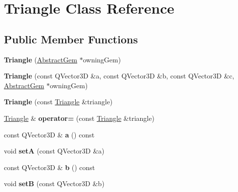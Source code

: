 \hypertarget{class_triangle}{}\section{Triangle Class Reference}
\label{class_triangle}
\subsection*{Public Member Functions}
\begin{DoxyCompactItemize}
\item 
\hypertarget{class_triangle_ab9220b045480de037944ed99913ecea8}{}{\bfseries Triangle} (\hyperlink{class_abstract_gem}{Abstract\+Gem} $\ast$owning\+Gem)\label{class_triangle_ab9220b045480de037944ed99913ecea8}

\item 
\hypertarget{class_triangle_a860d12ec88ef8821dd10a5a653a7413d}{}{\bfseries Triangle} (const Q\+Vector3\+D \&a, const Q\+Vector3\+D \&b, const Q\+Vector3\+D \&c, \hyperlink{class_abstract_gem}{Abstract\+Gem} $\ast$owning\+Gem)\label{class_triangle_a860d12ec88ef8821dd10a5a653a7413d}

\item 
\hypertarget{class_triangle_a889893fe34e2eb7121082b86199d5628}{}{\bfseries Triangle} (const \hyperlink{class_triangle}{Triangle} \&triangle)\label{class_triangle_a889893fe34e2eb7121082b86199d5628}

\item 
\hypertarget{class_triangle_aae57b61e09898f54256a83e76acfe502}{}\hyperlink{class_triangle}{Triangle} \& {\bfseries operator=} (const \hyperlink{class_triangle}{Triangle} \&triangle)\label{class_triangle_aae57b61e09898f54256a83e76acfe502}

\item 
\hypertarget{class_triangle_a430bf0a9d8eaf20ea7bdefcd8082588c}{}const Q\+Vector3\+D \& {\bfseries a} () const \label{class_triangle_a430bf0a9d8eaf20ea7bdefcd8082588c}

\item 
\hypertarget{class_triangle_a24c012d83d7e6c5d0b27985d8dcb64da}{}void {\bfseries set\+A} (const Q\+Vector3\+D \&a)\label{class_triangle_a24c012d83d7e6c5d0b27985d8dcb64da}

\item 
\hypertarget{class_triangle_a8327124c9b9b752be94187c9fbf3f460}{}const Q\+Vector3\+D \& {\bfseries b} () const \label{class_triangle_a8327124c9b9b752be94187c9fbf3f460}

\item 
\hypertarget{class_triangle_a9f889b49a5ea3b4be4c4366c63673095}{}void {\bfseries set\+B} (const Q\+Vector3\+D \&b)\label{class_triangle_a9f889b49a5ea3b4be4c4366c63673095}


\end{DoxyCompactItemize}
